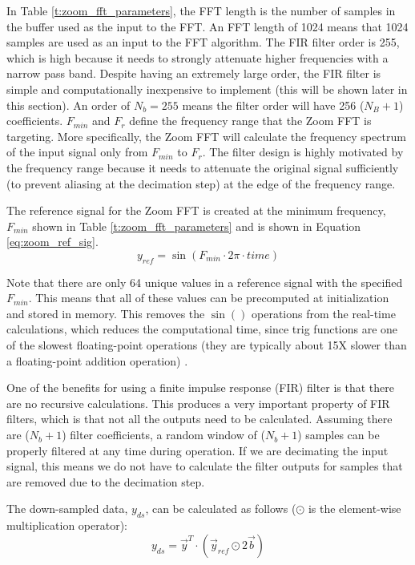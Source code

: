 In Table \ref{t:zoom_fft_parameters}, the FFT length is the number of samples in the buffer used as the input to the FFT. An FFT length of 1024 means that 1024 samples are used as an input to the FFT algorithm.  The FIR filter order is 255, which is high because it needs to strongly attenuate higher frequencies with a narrow pass band.  Despite having an extremely large order, the FIR filter is simple and computationally inexpensive to implement (this will be shown later in this section).  An order of $N_b=255$ means the filter order will have 256 ($N_B+1$) coefficients.  $F_{min}$ and $F_r$ define the frequency range that the Zoom FFT is targeting.  More specifically, the Zoom FFT will calculate the frequency spectrum of the input signal only from $F_{min}$ to $F_{r}$.  The filter design is highly motivated by the frequency range because it needs to attenuate the original signal sufficiently (to prevent aliasing at the decimation step) at the edge of the frequency range.

The reference signal for the Zoom FFT is created at the minimum frequency, $F_{min}$ shown in Table \ref{t:zoom_fft_parameters} and is shown in Equation \ref{eq:zoom_ref_sig}.
\begin{equation} \label{eq:zoom_ref_sig}
	y_{ref} = \sin{(F_{min} \cdot 2\pi \cdot time)}
\end{equation}

Note that there are only 64 unique values in a reference signal with the specified $F_{min}$.  This means that all of these values can be precomputed at initialization and stored in memory.  This removes the $\sin{()}$ operations from the real-time calculations, which reduces the computational time, since trig functions are one of the slowest floating-point operations (they are typically about 15X slower than a floating-point addition operation) \cite{flops_performance}.

One of the benefits for using a finite impulse response (FIR) filter is that there are no recursive calculations.  This produces a very important property of FIR filters, which is that not all the outputs need to be calculated.  Assuming there are ($N_b+1$) filter coefficients, a random window of ($N_b+1$) samples can be properly filtered at any time during operation.  If we are decimating the input signal, this means we do not have to calculate the filter outputs for samples that are removed due to the decimation step.

The down-sampled data, $y_{ds}$, can be calculated as follows ($\odot$ is the element-wise multiplication operator):
\begin{equation} \label{eq:zoom_y_ds}
	y_{ds} = \vec{y}^T \cdot \left( \vec{y}_{ref} \odot 2\vec{b} \right)
\end{equation}

